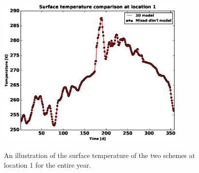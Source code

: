 \documentclass[review,11pt]{elsarticle}
\begin{document}
\begin{figure}[!htpb]
\centering
\includegraphics[height = 7.5cm, width=11.cm]{figures/comparison/regular/surf-temp/comp-temp-location1.eps} \\
\caption{An illustration of the surface temperature of the two schemes at location 1 for the entire year. %
}
\label{surf-temp-comp}
\end{figure}

\end{document}
